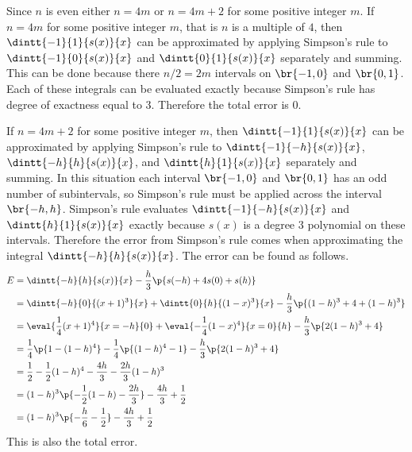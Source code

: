 \documentclass[11pt]{article}
\begin{document}
\begin{enumerate}
\begin{enumerate}
                Since $n$ is even either $n = 4m$ or $n = 4m + 2$ for some positive
                integer $m$.
                If $n = 4m$ for some positive integer $m$, that is $n$ is a multiple
                of $4$, then $\dintt{-1}{1}{s(x)}{x}$ can be approximated by
                applying Simpson's rule to $\dintt{-1}{0}{s(x)}{x}$ and 
                $\dintt{0}{1}{s(x)}{x}$ separately and summing.
                This can be done because there $n/2 = 2m$ intervals on $\br{-1, 0}$ and
                $\br{0,1}$.
                Each of these integrals can be evaluated exactly because Simpson's rule
                has degree of exactness equal to 3.
                Therefore the total error is 0.

                If $n = 4m + 2$ for some positive integer $m$, then 
                $\dintt{-1}{1}{s(x)}{x}$ can be approximated by
                applying Simpson's rule to $\dintt{-1}{-h}{s(x)}{x}$, 
                $\dintt{-h}{h}{s(x)}{x}$, and $\dintt{h}{1}{s(x)}{x}$ separately
                and summing.
                In this situation each interval $\br{-1,0}$ and $\br{0,1}$ has
                an odd number of subintervals, so Simpson's rule must be applied
                across the interval $\br{-h, h}$.
                Simpson's rule evaluates $\dintt{-1}{-h}{s(x)}{x}$ and
                $\dintt{h}{1}{s(x)}{x}$ exactly because $s(x)$ is a degree 3
                polynomial on these intervals.
                Therefore the error from Simpson's rule comes when approximating
                the integral $\dintt{-h}{h}{s(x)}{x}$.
                The error can be found as follows.
                \begin{align*}
                    E &= \dintt{-h}{h}{s(x)}{x} - \frac{h}{3} \p{s(-h) + 4s(0) + s(h)} \\
                    &= \dintt{-h}{0}{(x+1)^3}{x} + \dintt{0}{h}{(1-x)^3}{x} - \frac{h}{3} \p{(1-h)^3 + 4 + (1-h)^3} \\
                    &= \eval{\frac{1}{4}(x+1)^4}{x=-h}{0} + \eval{-\frac{1}{4}(1-x)^4}{x=0}{h} - \frac{h}{3} \p{2(1-h)^3 + 4} \\
                    &= \frac{1}{4}\p{1 - (1-h)^4} - \frac{1}{4}\p{(1-h)^4 - 1} - \frac{h}{3} \p{2(1-h)^3 + 4} \\
                    &= \frac{1}{2} - \frac{1}{2}(1-h)^4 - \frac{4h}{3} - \frac{2h}{3}(1-h)^3 \\
                    &= (1-h)^3\p{-\frac{1}{2}(1-h) - \frac{2h}{3}} - \frac{4h}{3} + \frac{1}{2} \\
                    &= (1-h)^3\p{-\frac{h}{6} -\frac{1}{2}} - \frac{4h}{3} + \frac{1}{2} \\
                \end{align*}
                This is also the total error.


\end{enumerate}
\end{enumerate}
\end{document}
